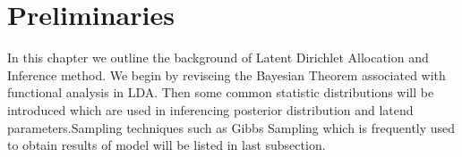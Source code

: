 \chapter{Preliminaries}
In this chapter we outline the background of Latent Dirichlet Allocation and Inference method. We begin by reviseing the Bayesian Theorem
associated with functional analysis in LDA. Then some common statistic distributions
 will be introduced which are used in inferencing posterior distribution and latend parameters.Sampling techniques such as Gibbs Sampling which is frequently used to obtain results of model will be listed in last subsection.
